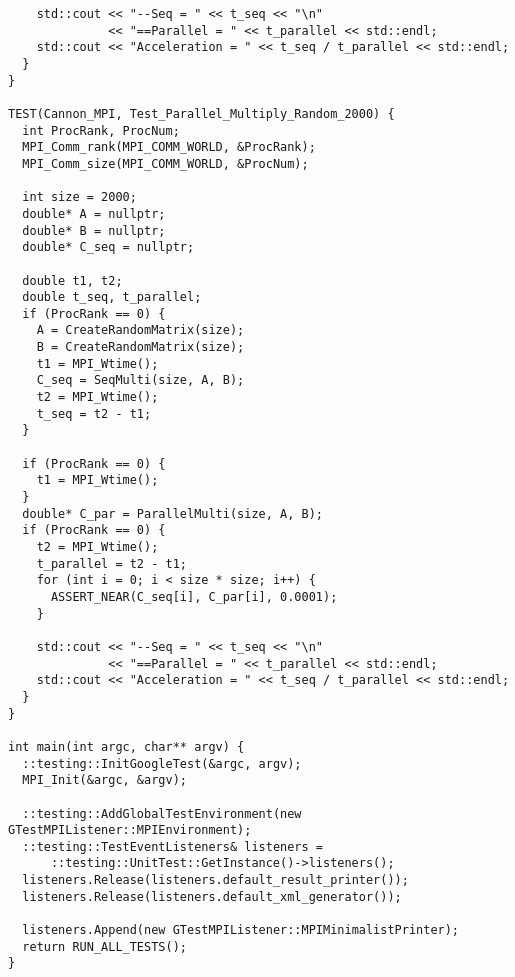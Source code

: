 \documentclass[12pt, letterpaper]{article}
\begin{document}
\begin{lstlisting}
    std::cout << "--Seq = " << t_seq << "\n"
              << "==Parallel = " << t_parallel << std::endl;
    std::cout << "Acceleration = " << t_seq / t_parallel << std::endl;
  }
}

TEST(Cannon_MPI, Test_Parallel_Multiply_Random_2000) {
  int ProcRank, ProcNum;
  MPI_Comm_rank(MPI_COMM_WORLD, &ProcRank);
  MPI_Comm_size(MPI_COMM_WORLD, &ProcNum);

  int size = 2000;
  double* A = nullptr;
  double* B = nullptr;
  double* C_seq = nullptr;

  double t1, t2;
  double t_seq, t_parallel;
  if (ProcRank == 0) {
    A = CreateRandomMatrix(size);
    B = CreateRandomMatrix(size);
    t1 = MPI_Wtime();
    C_seq = SeqMulti(size, A, B);
    t2 = MPI_Wtime();
    t_seq = t2 - t1;
  }

  if (ProcRank == 0) {
    t1 = MPI_Wtime();
  }
  double* C_par = ParallelMulti(size, A, B);
  if (ProcRank == 0) {
    t2 = MPI_Wtime();
    t_parallel = t2 - t1;
    for (int i = 0; i < size * size; i++) {
      ASSERT_NEAR(C_seq[i], C_par[i], 0.0001);
    }

    std::cout << "--Seq = " << t_seq << "\n"
              << "==Parallel = " << t_parallel << std::endl;
    std::cout << "Acceleration = " << t_seq / t_parallel << std::endl;
  }
}

int main(int argc, char** argv) {
  ::testing::InitGoogleTest(&argc, argv);
  MPI_Init(&argc, &argv);

  ::testing::AddGlobalTestEnvironment(new GTestMPIListener::MPIEnvironment);
  ::testing::TestEventListeners& listeners =
      ::testing::UnitTest::GetInstance()->listeners();
  listeners.Release(listeners.default_result_printer());
  listeners.Release(listeners.default_xml_generator());

  listeners.Append(new GTestMPIListener::MPIMinimalistPrinter);
  return RUN_ALL_TESTS();
}

\end{lstlisting}
\end{document}

